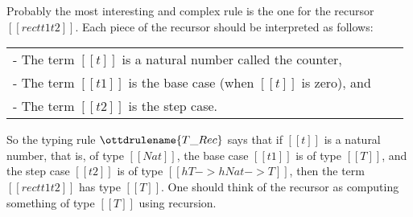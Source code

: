 \documentclass{article}
\begin{document}
Probably the most interesting and complex rule is the one for the
recursor $[[rec t t1 t2]]$. Each piece of the recursor should be
interpreted as follows:
\begin{center}
  \begin{tabular}{lll}
    - The term $[[t]]$ is a natural number called the counter,\\
    - The term $[[t1]]$ is the base case (when $[[t]]$ is zero), and\\
    - The term $[[t2]]$ is the step case.
  \end{tabular}
\end{center}
So the typing rule $\ottdrulename{T\_Rec}$ says that if $[[t]]$ is a
natural number, that is, of type $[[Nat]]$, the base case $[[t1]]$ is
of type $[[T]]$, and the step case $[[t2]]$ is of type $[[h{T -> h{Nat
    -> T}}]]$, then the term $[[rec t t1 t2]]$ has type $[[T]]$.  One
should think of the recursor as computing something of type $[[T]]$
using recursion.
\end{document}
